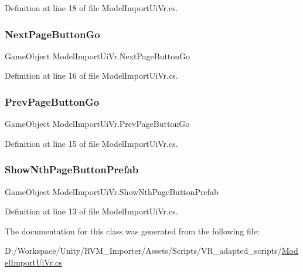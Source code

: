 Definition at line 18 of file Model\+Import\+Ui\+Vr.\+cs.

\mbox{\label{class_model_import_ui_vr_a3e500d9c3c5d5f0d2a4b9dda1e76a4f9}} 
\subsubsection{\texorpdfstring{NextPageButtonGo}{NextPageButtonGo}}
{\footnotesize\ttfamily Game\+Object Model\+Import\+Ui\+Vr.\+Next\+Page\+Button\+Go}



Definition at line 16 of file Model\+Import\+Ui\+Vr.\+cs.

\mbox{\label{class_model_import_ui_vr_a0ed1df0840dea3ca857fada817d83474}} 
\subsubsection{\texorpdfstring{PrevPageButtonGo}{PrevPageButtonGo}}
{\footnotesize\ttfamily Game\+Object Model\+Import\+Ui\+Vr.\+Prev\+Page\+Button\+Go}



Definition at line 15 of file Model\+Import\+Ui\+Vr.\+cs.

\mbox{\label{class_model_import_ui_vr_ae7e432d08fdcad54d5b6967373b166f9}} 
\subsubsection{\texorpdfstring{ShowNthPageButtonPrefab}{ShowNthPageButtonPrefab}}
{\footnotesize\ttfamily Game\+Object Model\+Import\+Ui\+Vr.\+Show\+Nth\+Page\+Button\+Prefab}



Definition at line 13 of file Model\+Import\+Ui\+Vr.\+cs.



The documentation for this class was generated from the following file\+:\begin{DoxyCompactItemize}
\item 
D\+:/\+Workspace/\+Unity/\+R\+V\+M\+\_\+\+Importer/\+Assets/\+Scripts/\+V\+R\+\_\+adapted\+\_\+scripts/\mbox{\hyperlink{_model_import_ui_vr_8cs}{Model\+Import\+Ui\+Vr.\+cs}}\end{DoxyCompactItemize}
